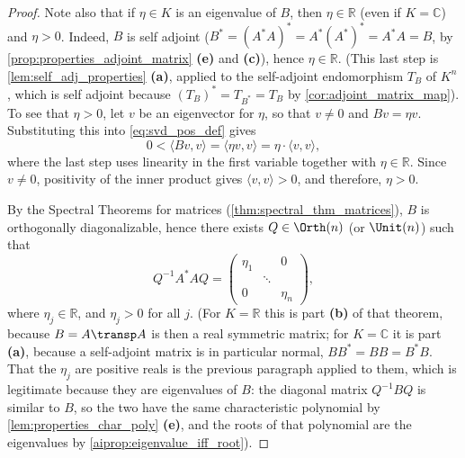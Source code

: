 \begin{proof}
Note also that if $\eta \in K$ is an eigenvalue of $B$, then $\eta \in \mathbb{R}$ (even if $K = \mathbb{C}$) and $\eta > 0$.
Indeed, $B$ is self adjoint ($B^* = (A^* A)^* = A^* (A^*)^* = A^* A = B$, by \cref{prop:properties_adjoint_matrix} \textbf{(e)} and \textbf{(c)}), hence $\eta \in \mathbb{R}$. (This last step is \cref{lem:self_adj_properties} \textbf{(a)}, applied to the self-adjoint endomorphism $T_B$ of $K^n$, which is self adjoint because $(T_B)^* = T_{B^*} = T_B$ by \cref{cor:adjoint_matrix_map}). To see that $\eta > 0$, let $v$ be an eigenvector for $\eta$, so that $v \neq 0$ and $Bv = \eta v$. Substituting this into \eqref{eq:svd_pos_def} gives
\[
0 < \langle Bv, v \rangle = \langle \eta v, v \rangle = \eta \cdot \langle v, v \rangle,
\]
where the last step uses linearity in the first variable together with $\eta \in \mathbb{R}$. Since $v \neq 0$, positivity of the inner product gives $\langle v, v \rangle > 0$, and therefore, $\eta > 0$.

By the Spectral Theorems for matrices (\cref{thm:spectral_thm_matrices}), $B$ is orthogonally diagonalizable, hence there exists $Q \in \Orth(n)$ (or $\Unit(n)$) such that
\[
Q^{-1} A^* A Q = \begin{pmatrix} \eta_1 & & 0 \\ & \ddots & \\ 0 & & \eta_n \end{pmatrix},
\]
where $\eta_j \in \mathbb{R}$, and $\eta_j > 0$ for all $j$.
(For $K = \mathbb{R}$ this is part \textbf{(b)} of that theorem, because $B = A\transp A$ is then a real symmetric matrix; for $K = \mathbb{C}$ it is part \textbf{(a)}, because a self-adjoint matrix is in particular normal, $B B^* = B B = B^* B$. That the $\eta_j$ are positive reals is the previous paragraph applied to them, which is legitimate because they are eigenvalues of $B$: the diagonal matrix $Q^{-1} B Q$ is similar to $B$, so the two have the same characteristic polynomial by \cref{lem:properties_char_poly} \textbf{(e)}, and the roots of that polynomial are the eigenvalues by \cref{aiprop:eigenvalue_iff_root}).


\end{proof}
